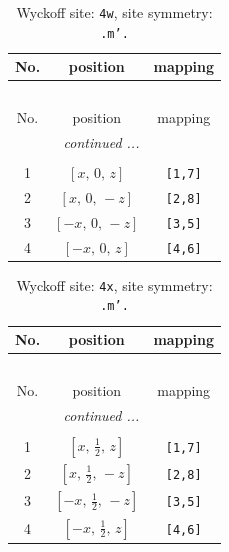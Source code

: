 \documentclass[fleqn,8pt]{jsarticle}
\begin{document}
\renewcommand{\arraystretch}{1.2}
\begin{longtable}{ccc}
\caption{Wyckoff site: {\tt 4w}, site symmetry: {\tt .m'.}}
 \\
 \hline \hline
No. & position & mapping \\ \hline \endfirsthead

\multicolumn{2}{l}{\tablename\ \thetable{}} \\
 \hline \hline
No. & position & mapping \\ \hline \endhead

 \hline \hline
\multicolumn{2}{r}{\footnotesize\it continued ...} \\ \endfoot

 \hline \hline
\multicolumn{2}{r}{} \\ \endlastfoot

1 & $\left[ x,\, 0,\, z \right]$ & {\tt [1,7]} \\ \hline
2 & $\left[ x,\, 0,\, - z \right]$ & {\tt [2,8]} \\ \hline
3 & $\left[ - x,\, 0,\, - z \right]$ & {\tt [3,5]} \\ \hline
4 & $\left[ - x,\, 0,\, z \right]$ & {\tt [4,6]} \\
\end{longtable}
\renewcommand{\arraystretch}{1.2}
\begin{longtable}{ccc}
\caption{Wyckoff site: {\tt 4x}, site symmetry: {\tt .m'.}}
 \\
 \hline \hline
No. & position & mapping \\ \hline \endfirsthead

\multicolumn{2}{l}{\tablename\ \thetable{}} \\
 \hline \hline
No. & position & mapping \\ \hline \endhead

 \hline \hline
\multicolumn{2}{r}{\footnotesize\it continued ...} \\ \endfoot

 \hline \hline
\multicolumn{2}{r}{} \\ \endlastfoot

1 & $\left[ x,\, \frac{1}{2},\, z \right]$ & {\tt [1,7]} \\ \hline
2 & $\left[ x,\, \frac{1}{2},\, - z \right]$ & {\tt [2,8]} \\ \hline
3 & $\left[ - x,\, \frac{1}{2},\, - z \right]$ & {\tt [3,5]} \\ \hline
4 & $\left[ - x,\, \frac{1}{2},\, z \right]$ & {\tt [4,6]} \\
\end{longtable}
\end{document}
